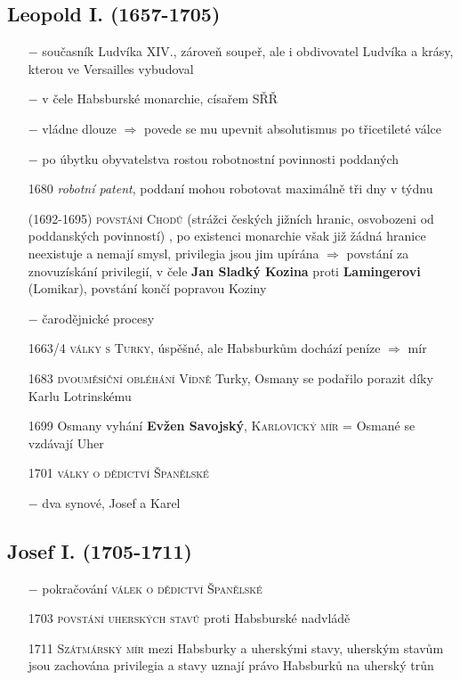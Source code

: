 \documentclass{article}
\begin{document}
\subsection*{Leopold I. (1657-1705)}
\begin{itemize}
    \vspace{-0.5em}
    \setlength\itemsep{0.15em}
    \item[$-$] současník Ludvíka XIV., zároveň soupeř, ale i obdivovatel Ludvíka a krásy, kterou ve Versailles vybudoval
    \item[$-$] v čele Habsburské monarchie, císařem SŘŘ
    \item[$-$] vládne dlouze $\Rightarrow$ povede se mu upevnit absolutismus po třicetileté válce
    \item[$-$] po úbytku obyvatelstva rostou robotnostní povinnosti poddaných
    \item[1680] \textit{robotní patent}, poddaní mohou robotovat maximálně tři dny v týdnu
    \item[(1692-1695)] \textsc{povstání Chodů} (strážci českých jižních hranic, osvobozeni od poddanských povinností) , po existenci monarchie však již žádná hranice neexistuje a nemají smysl, privilegia jsou jim upírána $\Rightarrow$ povstání za znovuzískání privilegií, v čele \textbf{Jan Sladký Kozina} proti \textbf{Lamingerovi} (Lomikar), povstání končí popravou Koziny
    \item[$-$] čarodějnické procesy
    \item[1663/4] \textsc{války s Turky}, úspěšné, ale Habsburkům dochází peníze $\Rightarrow$ mír
    \item[1683]  \textsc{dvouměsíční obléhání Vídně} Turky, Osmany se podařilo porazit díky Karlu Lotrinskému
    \item[1699] Osmany vyhání \textbf{Evžen Savojský}, \textsc{Karlovický mír} = Osmané se vzdávají Uher
    \item[1701] \textsc{války o dědictví Španělské}
    \item[$-$] dva synové, Josef a Karel

\end{itemize}


\subsection*{Josef I. (1705-1711)}
\begin{itemize}
    \vspace{-0.5em}
    \setlength\itemsep{0.15em}
    \item[$-$] pokračování \textsc{válek o dědictví Španělské}
    \item[1703] \textsc{povstání uherských stavů} proti Habsburské nadvládě
    \item[1711] \textsc{Szátmárský mír} mezi Habsburky a uherskými stavy, uherským stavům jsou zachována privilegia a stavy uznají právo Habsburků na uherský trůn
\end{itemize}
\end{document}
